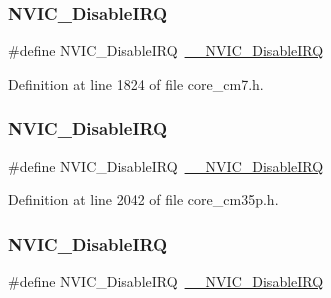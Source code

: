 \subsubsection{\texorpdfstring{N\+V\+I\+C\+\_\+\+Disable\+I\+RQ}{NVIC\_DisableIRQ}\hspace{0.1cm}{\footnotesize\ttfamily [10/13]}}
{\footnotesize\ttfamily \#define N\+V\+I\+C\+\_\+\+Disable\+I\+RQ~\hyperlink{group___c_m_s_i_s___core___n_v_i_c_functions_gae016e4c1986312044ee768806537d52f}{\+\_\+\+\_\+\+N\+V\+I\+C\+\_\+\+Disable\+I\+RQ}}



Definition at line 1824 of file core\+\_\+cm7.\+h.

\mbox{\label{group___c_m_s_i_s___core___n_v_i_c_functions_ga73b4e251f59cab4e9a5e234aac02ae57}} 
\subsubsection{\texorpdfstring{N\+V\+I\+C\+\_\+\+Disable\+I\+RQ}{NVIC\_DisableIRQ}\hspace{0.1cm}{\footnotesize\ttfamily [11/13]}}
{\footnotesize\ttfamily \#define N\+V\+I\+C\+\_\+\+Disable\+I\+RQ~\hyperlink{group___c_m_s_i_s___core___n_v_i_c_functions_gae016e4c1986312044ee768806537d52f}{\+\_\+\+\_\+\+N\+V\+I\+C\+\_\+\+Disable\+I\+RQ}}



Definition at line 2042 of file core\+\_\+cm35p.\+h.

\mbox{\label{group___c_m_s_i_s___core___n_v_i_c_functions_ga73b4e251f59cab4e9a5e234aac02ae57}} 
\subsubsection{\texorpdfstring{N\+V\+I\+C\+\_\+\+Disable\+I\+RQ}{NVIC\_DisableIRQ}\hspace{0.1cm}{\footnotesize\ttfamily [12/13]}}
{\footnotesize\ttfamily \#define N\+V\+I\+C\+\_\+\+Disable\+I\+RQ~\hyperlink{group___c_m_s_i_s___core___n_v_i_c_functions_gae016e4c1986312044ee768806537d52f}{\+\_\+\+\_\+\+N\+V\+I\+C\+\_\+\+Disable\+I\+RQ}}



